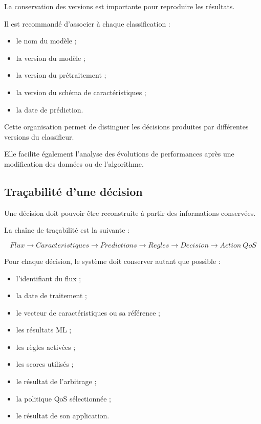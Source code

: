 La conservation des versions est importante pour reproduire les résultats.

Il est recommandé d'associer à chaque classification :

\begin{itemize}
    \item le nom du modèle ;
    \item la version du modèle ;
    \item la version du prétraitement ;
    \item la version du schéma de caractéristiques ;
    \item la date de prédiction.
\end{itemize}

Cette organisation permet de distinguer les décisions produites par différentes versions du classifieur.

Elle facilite également l'analyse des évolutions de performances après une modification des données ou de l'algorithme.

\subsection{Traçabilité d'une décision}

Une décision doit pouvoir être reconstruite à partir des informations conservées.

La chaîne de traçabilité est la suivante :

\[
Flux
\rightarrow
Caracteristiques
\rightarrow
Predictions
\rightarrow
Regles
\rightarrow
Decision
\rightarrow
Action\ QoS
\]

Pour chaque décision, le système doit conserver autant que possible :

\begin{itemize}
    \item l'identifiant du flux ;
    \item la date de traitement ;
    \item le vecteur de caractéristiques ou sa référence ;
    \item les résultats ML ;
    \item les règles activées ;
    \item les scores utilisés ;
    \item le résultat de l'arbitrage ;
    \item la politique QoS sélectionnée ;
    \item le résultat de son application.
\end{itemize}

